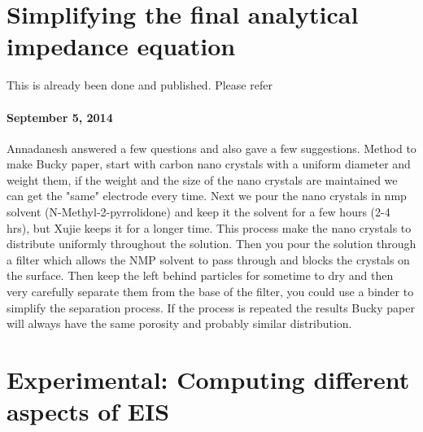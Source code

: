 \documentclass[12pt]{book}
\begin{document}
\section{Simplifying the final analytical impedance equation}
This is already been done and published. Please refer~\cite{Mehta2014a}

\paragraph{September 5, 2014}
Annadanesh answered a few questions and also gave a few suggestions. Method to make Bucky paper, start with carbon nano crystals with a uniform diameter and weight them, if the weight and the size of the nano crystals are maintained we can get the "same" electrode every time. Next we pour the nano crystals in nmp solvent (N-Methyl-2-pyrrolidone) and keep it the solvent for a few hours (2-4 hrs), but Xujie keeps it for a longer time. This process make the nano crystals to distribute uniformly throughout the solution. Then you pour the solution through a filter which allows the NMP solvent to pass through and blocks the crystals on the surface. Then keep the left behind particles for sometime to dry and then very carefully separate them from the base of the filter, you could use a binder to simplify the separation process. If the process is repeated the results Bucky paper will always have the same porosity and probably similar distribution.

\section{Experimental: Computing different aspects of EIS}
\end{document}
